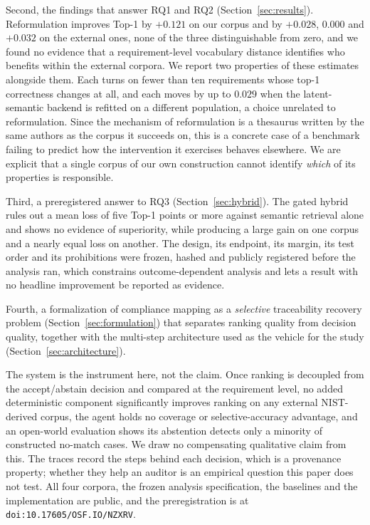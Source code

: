 \documentclass[smallextended,natbib]{svjour3}
\begin{document}
Second, the findings that answer RQ1 and RQ2 (Section~\ref{sec:results}). Reformulation improves Top-1 by $+0.121$ on our corpus and by $+0.028$, $0.000$ and $+0.032$ on the external ones, none of the three distinguishable from zero, and we found no evidence that a requirement-level vocabulary distance identifies who benefits within the external corpora. We report two properties of these estimates alongside them. Each turns on fewer than ten requirements whose top-1 correctness changes at all, and each moves by up to $0.029$ when the latent-semantic backend is refitted on a different population, a choice unrelated to reformulation. Since the mechanism of reformulation is a thesaurus written by the same authors as the corpus it succeeds on, this is a concrete case of a benchmark failing to predict how the intervention it exercises behaves elsewhere. We are explicit that a single corpus of our own construction cannot identify \emph{which} of its properties is responsible.

Third, a preregistered answer to RQ3 (Section~\ref{sec:hybrid}). The gated hybrid rules out a mean loss of five Top-1 points or more against semantic retrieval alone and shows no evidence of superiority, while producing a large gain on one corpus and a nearly equal loss on another. The design, its endpoint, its margin, its test order and its prohibitions were frozen, hashed and publicly registered before the analysis ran, which constrains outcome-dependent analysis and lets a result with no headline improvement be reported as evidence.

Fourth, a formalization of compliance mapping as a \emph{selective} traceability recovery problem (Section~\ref{sec:formulation}) that separates ranking quality from decision quality, together with the multi-step architecture used as the vehicle for the study (Section~\ref{sec:architecture}).

The system is the instrument here, not the claim. Once ranking is decoupled from the accept/abstain decision and compared at the requirement level, no added deterministic component significantly improves ranking on any external NIST-derived corpus, the agent holds no coverage or selective-accuracy advantage, and an open-world evaluation shows its abstention detects only a minority of constructed no-match cases.
We draw no compensating qualitative claim from this.
The traces record the steps behind each decision, which is a provenance property; whether they help an auditor is an empirical question this paper does not test.
All four corpora, the frozen analysis specification, the baselines and the implementation are public, and the preregistration is at \texttt{doi:10.17605/OSF.IO/NZXRV}.
\end{document}
